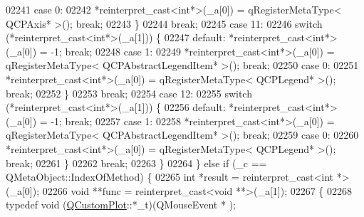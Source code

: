\begin{DoxyCode}
02241             \textcolor{keywordflow}{case} 0:
02242                 *\textcolor{keyword}{reinterpret\_cast<}\textcolor{keywordtype}{int}*\textcolor{keyword}{>}(\_a[0]) = qRegisterMetaType< QCPAxis* >(); \textcolor{keywordflow}{break};
02243             \}
02244             \textcolor{keywordflow}{break};
02245         \textcolor{keywordflow}{case} 11:
02246             \textcolor{keywordflow}{switch} (*reinterpret\_cast<int*>(\_a[1])) \{
02247             \textcolor{keywordflow}{default}: *\textcolor{keyword}{reinterpret\_cast<}\textcolor{keywordtype}{int}*\textcolor{keyword}{>}(\_a[0]) = -1; \textcolor{keywordflow}{break};
02248             \textcolor{keywordflow}{case} 1:
02249                 *\textcolor{keyword}{reinterpret\_cast<}\textcolor{keywordtype}{int}*\textcolor{keyword}{>}(\_a[0]) = qRegisterMetaType< QCPAbstractLegendItem* >(); \textcolor{keywordflow}{break};
02250             \textcolor{keywordflow}{case} 0:
02251                 *\textcolor{keyword}{reinterpret\_cast<}\textcolor{keywordtype}{int}*\textcolor{keyword}{>}(\_a[0]) = qRegisterMetaType< QCPLegend* >(); \textcolor{keywordflow}{break};
02252             \}
02253             \textcolor{keywordflow}{break};
02254         \textcolor{keywordflow}{case} 12:
02255             \textcolor{keywordflow}{switch} (*reinterpret\_cast<int*>(\_a[1])) \{
02256             \textcolor{keywordflow}{default}: *\textcolor{keyword}{reinterpret\_cast<}\textcolor{keywordtype}{int}*\textcolor{keyword}{>}(\_a[0]) = -1; \textcolor{keywordflow}{break};
02257             \textcolor{keywordflow}{case} 1:
02258                 *\textcolor{keyword}{reinterpret\_cast<}\textcolor{keywordtype}{int}*\textcolor{keyword}{>}(\_a[0]) = qRegisterMetaType< QCPAbstractLegendItem* >(); \textcolor{keywordflow}{break};
02259             \textcolor{keywordflow}{case} 0:
02260                 *\textcolor{keyword}{reinterpret\_cast<}\textcolor{keywordtype}{int}*\textcolor{keyword}{>}(\_a[0]) = qRegisterMetaType< QCPLegend* >(); \textcolor{keywordflow}{break};
02261             \}
02262             \textcolor{keywordflow}{break};
02263         \}
02264     \} \textcolor{keywordflow}{else} \textcolor{keywordflow}{if} (\_c == QMetaObject::IndexOfMethod) \{
02265         \textcolor{keywordtype}{int} *result = \textcolor{keyword}{reinterpret\_cast<}\textcolor{keywordtype}{int} *\textcolor{keyword}{>}(\_a[0]);
02266         \textcolor{keywordtype}{void} **func = \textcolor{keyword}{reinterpret\_cast<}\textcolor{keywordtype}{void} **\textcolor{keyword}{>}(\_a[1]);
02267         \{
02268             \textcolor{keyword}{typedef} void (\hyperlink{a00030_d8/d00/a00186}{QCustomPlot}::*\_t)(QMouseEvent * );

\end{DoxyCode}
